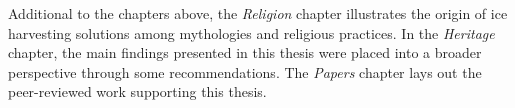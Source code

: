 Additional to the chapters above, the \textit{Religion} chapter illustrates the origin of ice harvesting
solutions among mythologies and religious practices. In the \textit{Heritage} chapter, the main findings
presented in this thesis were placed into a broader perspective through some recommendations. The
\textit{Papers} chapter lays out the peer-reviewed work supporting this thesis.


